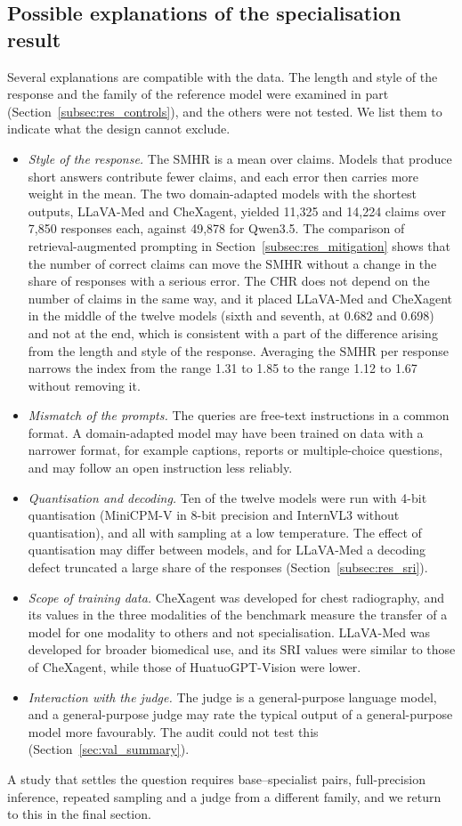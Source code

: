 \documentclass[11pt,a4paper]{article}
\providecommand{\Ncalls}{7{,}850}
\newcommand{\SMHR}{\ensuremath{\mathrm{SMHR}}}
\newcommand{\CHR}{\ensuremath{\mathrm{CHR}}}
\newcommand{\SRI}{\ensuremath{\mathrm{SRI}}}
\begin{document}
\subsection{Possible explanations of the specialisation result}\label{sec:disc_explain}
Several explanations are compatible with the data. The length and style of the response and the family of the reference model were examined in part (Section~\ref{subsec:res_controls}), and the others were not tested. We list them to indicate what the design cannot exclude.
\begin{itemize}
  \item \emph{Style of the response.} The \SMHR{} is a mean over claims. Models that produce short answers contribute fewer claims, and each error then carries more weight in the mean. The two domain-adapted models with the shortest outputs, LLaVA-Med and CheXagent, yielded 11,325 and 14,224 claims over \Ncalls{} responses each, against 49,878 for Qwen3.5. The comparison of retrieval-augmented prompting in Section~\ref{subsec:res_mitigation} shows that the number of correct claims can move the \SMHR{} without a change in the share of responses with a serious error. The \CHR{} does not depend on the number of claims in the same way, and it placed LLaVA-Med and CheXagent in the middle of the twelve models (sixth and seventh, at 0.682 and 0.698) and not at the end, which is consistent with a part of the difference arising from the length and style of the response. Averaging the \SMHR{} per response narrows the index from the range 1.31 to 1.85 to the range 1.12 to 1.67 without removing it.
  \item \emph{Mismatch of the prompts.} The queries are free-text instructions in a common format. A domain-adapted model may have been trained on data with a narrower format, for example captions, reports or multiple-choice questions, and may follow an open instruction less reliably.
  \item \emph{Quantisation and decoding.} Ten of the twelve models were run with 4-bit quantisation (MiniCPM-V in 8-bit precision and InternVL3 without quantisation), and all with sampling at a low temperature. The effect of quantisation may differ between models, and for LLaVA-Med a decoding defect truncated a large share of the responses (Section~\ref{subsec:res_sri}).
  \item \emph{Scope of training data.} CheXagent was developed for chest radiography, and its values in the three modalities of the benchmark measure the transfer of a model for one modality to others and not specialisation. LLaVA-Med was developed for broader biomedical use, and its \SRI{} values were similar to those of CheXagent, while those of HuatuoGPT-Vision were lower.
  \item \emph{Interaction with the judge.} The judge is a general-purpose language model, and a general-purpose judge may rate the typical output of a general-purpose model more favourably. The audit could not test this (Section~\ref{sec:val_summary}).
\end{itemize}
A study that settles the question requires base--specialist pairs, full-precision inference, repeated sampling and a judge from a different family, and we return to this in the final section.
\end{document}
